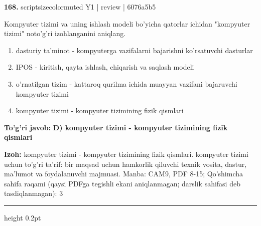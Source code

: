 \documentclass[10pt,a4paper]{article}
\begin{document}
{\bfseries\sffamily\color{ink} 168.} {scriptsizecolor{muted} Y1 | review | 6076a5b5}
\par
Kompyuter tizimi va uning ishlash modeli bo'yicha qatorlar ichidan "kompyuter tizimi" noto'g'ri izohlanganini aniqlang.
\begin{enumerate}[label=\Alph*),leftmargin=9mm]
\item dasturiy ta'minot - kompyuterga vazifalarni bajarishni ko'rsatuvchi dasturlar
\item IPOS - kiritish, qayta ishlash, chiqarish va saqlash modeli
\item o'rnatilgan tizim - kattaroq qurilma ichida muayyan vazifani bajaruvchi kompyuter tizimi
\item kompyuter tizimi - kompyuter tizimining fizik qismlari
\end{enumerate}
\begin{tcolorbox}[enhanced,breakable,colback=teal!4,colframe=teal!60!black,boxrule=0.45pt,arc=1.2mm,left=2.7mm,right=2.7mm,top=1.8mm,bottom=1.8mm,before skip=2mm,after skip=2mm]
{\bfseries\sffamily\color{teal}To'g'ri javob:} \textbf{D) kompyuter tizimi - kompyuter tizimining fizik qismlari}
\par\smallskip
{\bfseries Izoh:} kompyuter tizimi - kompyuter tizimining fizik qismlari. kompyuter tizimi uchun to'g'ri ta'rif: bir maqsad uchun hamkorlik qiluvchi texnik vosita, dastur, ma'lumot va foydalanuvchi majmuasi. Manba: CAM9, PDF 8-15; Qo'shimcha sahifa raqami (qaysi PDFga tegishli ekani aniqlanmagan; darslik sahifasi deb tasdiqlanmagan): 3
\end{tcolorbox}
\vspace{2mm}\hrule height 0.2pt\vspace{3mm}
\end{document}
